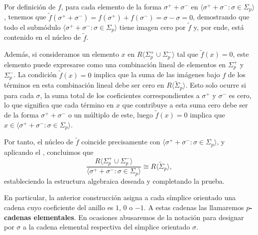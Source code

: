 Por definición de \(f\), para cada elemento de la forma \(\sigma^{+}+ \sigma^{-}\)
en \(\langle \sigma^{+}+ \sigma^{-}: \sigma \in \Sigma_{p}\rangle\), tenemos que \(\tilde
{f}(\sigma^{+}+ \sigma^{-}) = f(\sigma^{+}) + f(\sigma^{-}) = \sigma - \sigma = 0\),
demostrando que todo el submódulo
\(\langle \sigma^{+}+ \sigma^{-}: \sigma \in \Sigma_{p}\rangle\) tiene imagen cero
por \(\tilde{f}\) y, por ende, está contenido en el núcleo de \(\tilde{f}\).

Además, si consideramos un elemento \(x\) en \(R\langle \Sigma_{p}^{+}\cup \Sigma_{p}
^{-}\rangle\) tal que \(\tilde{f}(x) = 0\), este elemento puede expresarse como una
combinación lineal de elementos en \(\Sigma_{p}^{+}\) y \(\Sigma_{p}^{-}\). La condición
\(\tilde{f}(x) = 0\) implica que la suma de las imágenes bajo \(f\) de los términos en
esta combinación lineal debe ser cero en \(R \langle \tilde{\Sigma}_{p}\rangle\).
Esto solo ocurre si para cada \(\sigma\), la suma total de los coeficientes correspondientes
a \(\sigma^{+}\) y \(\sigma^{-}\) es cero, lo que significa que cada término en \(x\)
que contribuye a esta suma cero debe ser de la forma \(\sigma^{+}+ \sigma^{-}\) o
un múltiplo de este, luego \(\tilde{f}(x) = 0\) implica que \(x \in \langle \sigma^{+}
+ \sigma^{-}: \sigma \in \Sigma_{p}\rangle\).

Por tanto, el núcleo de \(\tilde{f}\) coincide precisamente con
\(\langle \sigma^{+}+ \sigma^{-}: \sigma \in \Sigma_{p}\rangle\), y aplicando el ,
concluimos que
\[
\frac{R\langle \Sigma_{p}^{+}\cup \Sigma_{p}^{-}\rangle}{\langle \sigma^{+}+
	\sigma^{-}: \sigma \in \Sigma_{p}\rangle}\cong R \langle \tilde{\Sigma}_{p}\rangle
,
\]
estableciendo la estructura algebraica deseada y completando la prueba.

\begin{observacion}
	En particular, la anterior construcción asigna a cada símplice orientado una
	cadena cuyo coeficiente del anillo es \(1\), \(0\) o \(-1\). A estas cadenas las
	llamaremos \textbf{\(p\)-cadenas elementales}. En ocasiones abusaremos de la
	notación para designar por \(\sigma\) a la cadena elemental respectiva del
	símplice orientado \(\sigma\).
\end{observacion}

